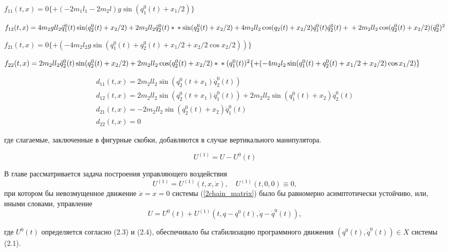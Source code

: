$f_{11}(t,x) = 0 \{ + (- 2 m_1 l_1 - 2 m_2 l) g \sin (q_1^0 (t) + x_1 / 2) \}$

$f_{12}(t,x) = 4 m_2 g l l_2 \ddot q_1^0 (t) \sin (q_2^0 (t) + x_2 / 2) + 2 m_2 l l_2 \ddot q_2^0 (t) * \\ 
* \sin (q_2^0 (t) + x_2 / 2) + 4 m_2 l l_2 \cos (q_2(t) + x_2 / 2) \dot q_1^0 (t) \dot q_2^0 (t) + \\ 
+ 2 m_2 l l_2 \cos (q_2^0 (t) + x_2 / 2) (\dot q_2^0)^2$

$f_{21}(t,x) = 0 \{ + (-4 m_2 l_2 g \sin (q_1^0 (t) + q_2^0 (t) + x_1 /2 + x_2 / 2 \cos x_2 / 2)) \}$

$f_{22}(t,x) = 2 m_2 l l_2 \ddot q_2^0 (t) \sin (q_2^0 (t) + x_2 / 2) + 2 m_2 l l_2 \cos (q_2^0 (t) + x_2 /2) * \\ 
* (q_1^0 (t))^2 \{ + (-4 m_2 l_2 \sin (q_1^0 (t) + q_2^0 (t) + x_1 / 2 + x_2 /2) \cos x_1 /2) \}$

$$
\begin{array}{l}
d_{11}(t, x) = 2 m_2 l l_2 \sin(q_2^0 (t + x_1) \dot q_2^0 (t)) \\
d_{12}(t, x) = 2 m_2 l l_2 \sin(q_2^0 (t + x_1) \dot q_1^0 (t)) + 2 m_2 l l_2 \sin(q_1^0 (t) + x_2) \dot q_2^0 (t) \\
d_{21}(t, x) = - 2 m_2 l l_2 \sin (q_2^0 (t) + x_2) \dot q_1^0 (t) \\
d_{22}(t, x) = 0
\end{array}
$$

где слагаемые, заключенные в фигурные скобки, добавляются в случае вертикального манипулятора.

$$ U^{(1)} = U - U^{0}(t) $$

В главе рассматривается задача построения управляющего воздействия $$ U^{(1)} = U^{(1)}(t, x, \dot x), \quad U^{(1)} (t, 0, 0) \equiv 0, $$ при котором бы невозмущенное движение $\dot x = x = 0$  системы (\ref{2chain_matrix}) было бы равномерно асимптотически устойчиво, или, иными словами, управление $$U = U^0(t) + U^{(1)}(t, q-q^0(t), \dot q - \dot q^0(t)),$$

где $U^0(t)$ определяется согласно (2.3) и (2.4), обеспечивало бы стабилизацию программного движения $(q^0(t), \dot q^0(t)) \in X$  системы (2.1).